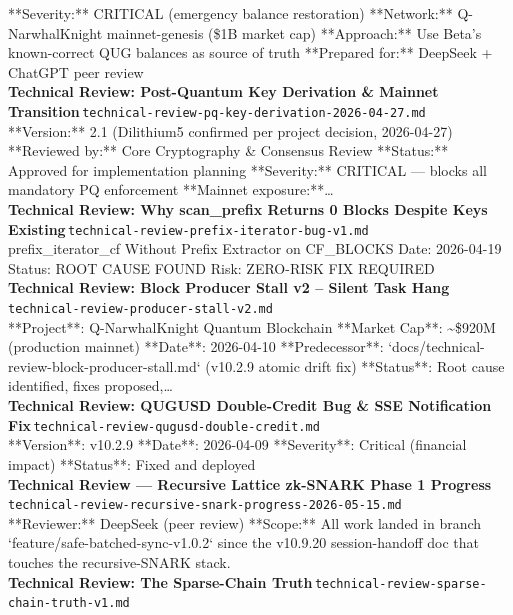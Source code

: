 \documentclass[11pt,a4paper]{article}
\begin{document}
**Severity:** CRITICAL (emergency balance restoration) **Network:** Q-NarwhalKnight mainnet-genesis (\$1B market cap) **Approach:** Use Beta's known-correct QUG balances as source of truth **Prepared for:** DeepSeek + ChatGPT peer review\\[6pt]
\noindent\textbf{Technical Review: Post-Quantum Key Derivation \& Mainnet Transition}\,\textcolor{qgray}{\small \texttt{technical-review-pq-key-derivation-2026-04-27.md}}\\
**Version:** 2.1 (Dilithium5 confirmed per project decision, 2026-04-27) **Reviewed by:** Core Cryptography \& Consensus Review **Status:** Approved for implementation planning **Severity:** CRITICAL --- blocks all mandatory PQ enforcement **Mainnet exposure:**\ldots{}\\[6pt]
\noindent\textbf{Technical Review: Why scan\_prefix Returns 0 Blocks Despite Keys Existing}\,\textcolor{qgray}{\small \texttt{technical-review-prefix-iterator-bug-v1.md}}\\
prefix\_iterator\_cf Without Prefix Extractor on CF\_BLOCKS Date: 2026-04-19 \textbar{} Status: ROOT CAUSE FOUND \textbar{} Risk: ZERO-RISK FIX REQUIRED\\[6pt]
\noindent\textbf{Technical Review: Block Producer Stall v2 -- Silent Task Hang}\,\textcolor{qgray}{\small \texttt{technical-review-producer-stall-v2.md}}\\
**Project**: Q-NarwhalKnight Quantum Blockchain **Market Cap**: \textasciitilde{}\$920M (production mainnet) **Date**: 2026-04-10 **Predecessor**: `docs/technical-review-block-producer-stall.md` (v10.2.9 atomic drift fix) **Status**: Root cause identified, fixes proposed,\ldots{}\\[6pt]
\noindent\textbf{Technical Review: QUGUSD Double-Credit Bug \& SSE Notification Fix}\,\textcolor{qgray}{\small \texttt{technical-review-qugusd-double-credit.md}}\\
**Version**: v10.2.9 **Date**: 2026-04-09 **Severity**: Critical (financial impact) **Status**: Fixed and deployed\\[6pt]
\noindent\textbf{Technical Review --- Recursive Lattice zk-SNARK Phase 1 Progress}\,\textcolor{qgray}{\small \texttt{technical-review-recursive-snark-progress-2026-05-15.md}}\\
**Reviewer:** DeepSeek (peer review) **Scope:** All work landed in branch `feature/safe-batched-sync-v1.0.2` since the v10.9.20 session-handoff doc that touches the recursive-SNARK stack.\\[6pt]
\noindent\textbf{Technical Review: The Sparse-Chain Truth}\,\textcolor{qgray}{\small \texttt{technical-review-sparse-chain-truth-v1.md}}\\
\end{document}
